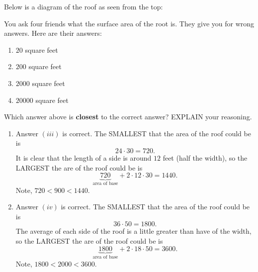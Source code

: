 \documentclass[nooutcomes,noauthor,hints]{ximera}
\begin{document}
\begin{question}
\begin{enumerate}
\begin{center}
  \end{center}
  Below is a diagram of the roof as seen from the top:
\begin{center}
\end{center}
  You ask four friends what the surface area of the root is. They give
  you for wrong answers. Here are their answers:
    \begin{enumerate}
    \item $20$ square feet
    \item $200$ square feet
    \item $2000$ square feet
    \item $20000$ square feet
    \end{enumerate}
    Which answer above is \textbf{closest} to the correct answer? EXPLAIN your reasoning.
  \end{enumerate}
  \begin{freeResponse}
    \begin{enumerate}
    \item Answer $(iii)$ is correct. The SMALLEST that the area of the
      roof could be is
      \[
      24\cdot 30 = 720.
      \]
      It is clear that the length of a side is around $12$ feet (half the width), so
      the LARGEST the are of the roof could be is
      \[
      \underbrace{720}_{\text{area of base}} + 2\cdot 12\cdot 30 = 1440.
      \]
      Note, $720 < 900 < 1440$.
    \item Answer $(iv)$ is correct.  The SMALLEST that the area of the
      roof could be is
      \[
      36\cdot 50 = 1800.
      \]
      The average of each side of the roof is a little greater than
      have of the width, so the LARGEST the are of the roof could be
      is
      \[
      \underbrace{1800}_{\text{area of base}} + 2\cdot 18\cdot 50 = 3600.
      \]
      Note, $1800 < 2000 < 3600$.
    \end{enumerate}
  \end{freeResponse}
\end{question}
\mynewpage
\end{document}
